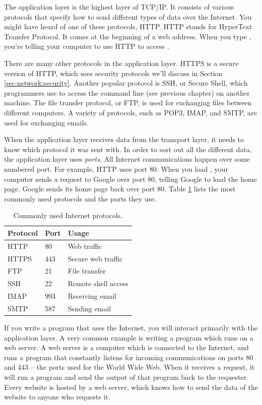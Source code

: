 The application layer is the highest layer of TCP/IP. It consists of various protocols that specify how to send different types of data over the Internet. You might have heard of one of these protocols, HTTP. HTTP stands for HyperText Transfer Protocol. It comes at the beginning of a web address. When you type , you're telling your computer to use HTTP to access .

There are many other protocols in the application layer. HTTPS is a secure version of HTTP, which uses security protocols we'll discuss in Section \ref{sec:network:security}. Another popular protocol is SSH, or Secure Shell, which programmers use to access the command line (see previous chapter) on another machine. The file transfer protocol, or FTP, is used for exchanging files between different computers. A variety of protocols, such as POP3, IMAP, and SMTP, are used for exchanging emails.

When the application layer receives data from the transport layer, it needs to know which protocol it was sent with. In order to sort out all the different data, the application layer uses \emph{ports}. All Internet communications happen over some numbered port. For example, HTTP uses port 80. When you load , your computer sends a request to Google over port 80, telling Google to load the home page. Google sends its home page back over port 80. Table \ref{tab:common_ports} lists the most commonly used protocols and the ports they use.

\begin{table}
    \centering
    \begin{tabular}{lll}
        Protocol & Port & Usage \\
        \hline
        HTTP & 80 & Web traffic \\
        HTTPS & 443 & Secure web traffic \\
        FTP & 21 & File transfer \\
        SSH & 22 & Remote shell access \\
        IMAP & 993 & Receiving email \\
        SMTP & 587 & Sending email
    \end{tabular}
    \caption{Commonly used Internet protocols.}
    \label{tab:common_ports}
\end{table}

If you write a program that uses the Internet, you will interact primarily with the application layer. A very common example is writing a program which runs on a web server. A web server is a computer which is connected to the Internet, and runs a program that constantly listens for incoming communications on ports 80 and 443 -- the ports used for the World Wide Web. When it receives a request, it will run a program and send the output of that program back to the requester. Every website is hosted by a web server, which knows how to send the data of the website to anyone who requests it.

